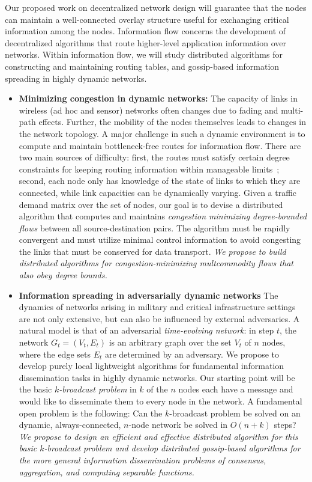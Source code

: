  Our proposed work on decentralized network
design will guarantee that the nodes can maintain a well-connected
overlay structure useful for exchanging critical information among the
nodes.  Information flow concerns the development of decentralized
algorithms that route higher-level application information over
networks.  Within information flow, we will study distributed
algorithms for constructing and maintaining routing tables, and
gossip-based information spreading in highly dynamic networks.

\begin{itemize}
\item
{\bf Minimizing congestion in dynamic networks:} The capacity of links
in wireless (ad hoc and sensor) networks often changes due to fading
and multi-path effects.  Further, the mobility of the nodes themselves
leads to changes in the network topology.  A major challenge in such a
dynamic environment is to compute and maintain bottleneck-free routes
for information flow.  There are two main sources of difficulty:
first, the routes must satisfy certain degree constraints for keeping
routing information within manageable limits~\cite{chen+rs:flow};
second, each node only has knowledge of the state of links to which
they are connected, while link capacities can be dynamically varying.
Given a traffic demand matrix over the set of nodes, our goal is to
devise a distributed algorithm that computes and maintains {\em
  congestion minimizing degree-bounded flows}\/ between all
source-destination pairs.  The algorithm must be rapidly convergent
and must utilize minimal control information to avoid congesting the
links that must be conserved for data transport. {\em We propose to
  build distributed algorithms for congestion-minimizing multcommodity
  flows that also obey degree bounds.}

\item
{\bf Information spreading in adversarially dynamic networks} The
dynamics of networks arising in military and critical infrastructure
settings are not only extensive, but can also be influenced by
external adversaries.  A natural model is that of an adversarial {\em
  time-evolving network}: in step $t$, the network $G_t = (V_t, E_t)$
is an arbitrary graph over the set $V_t$ of $n$ nodes, where the edge
sets $E_t$ are determined by an adversary.  We propose to develop
purely local lightweight algorithms for fundamental information
dissemination tasks in highly dynamic networks.  Our starting point
will be the basic {\em $k$-broadcast problem} in $k$ of the $n$ nodes
each have a message and would like to disseminate them to every node
in the network.  A fundamental open problem is the following: Can the
$k$-broadcast problem be solved on an dynamic, always-connected,
$n$-node network be solved in $O(n + k)$ steps? {\em We propose to
  design an efficient and effective distributed algorithm for this
  basic $k$-broadcast problem and develop distributed gossip-based
  algorithms for the more general information dissemination problems
  of consensus, aggregation, and computing separable functions.}


\end{itemize}

